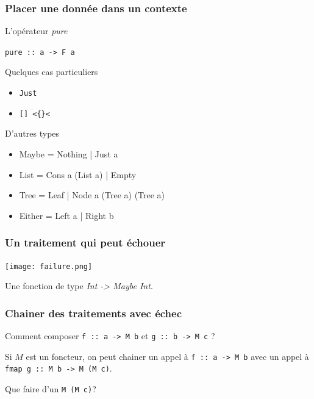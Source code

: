 \documentclass{beamer}
\begin{document}
\begin{frame}
\frametitle{Placer une donnée dans un contexte}

\begin{block}{L'opérateur \emph{pure}}
\begin{center}
\verb!pure :: a -> F a!
\end{center}
\end{block}

\begin{exampleblock}{Quelques cas particuliers}
	\begin{itemize}
		\item \verb!Just!
		\item \verb![] <{}<!
	\end{itemize}
\end{exampleblock}
\begin{block}{D'autres types}
	\begin{itemize}
		\item Maybe =  Nothing | Just a
		\item List =  Cons a (List a) | Empty
		\item Tree = Leaf | Node a (Tree a) (Tree a)
		\item Either = Left a | Right b
	\end{itemize}
\end{block}
\end{frame}


\begin{frame}
\frametitle{Un traitement qui peut échouer}

\begin{center}
\texttt{[image: failure.png]}
\end{center}
\begin{exampleblock}{}
Une fonction de type \emph{Int -> Maybe Int}.
\end{exampleblock}
\end{frame}

\begin{frame}
\frametitle{Chainer des traitements avec échec}
\begin{block}{}
Comment composer \verb!f :: a -> M b! et \verb!g :: b -> M c! ?
\end{block}
\pause
\begin{block}{}
Si $M$ est un foncteur, on peut chainer un appel à
\verb!f :: a -> M b! avec un appel à \verb!fmap g :: M b -> M (M c)!.
\end{block}
\pause
\begin{block}{}
Que faire d'un \verb!M (M c)!?
\end{block}

\end{frame}
\end{document}
